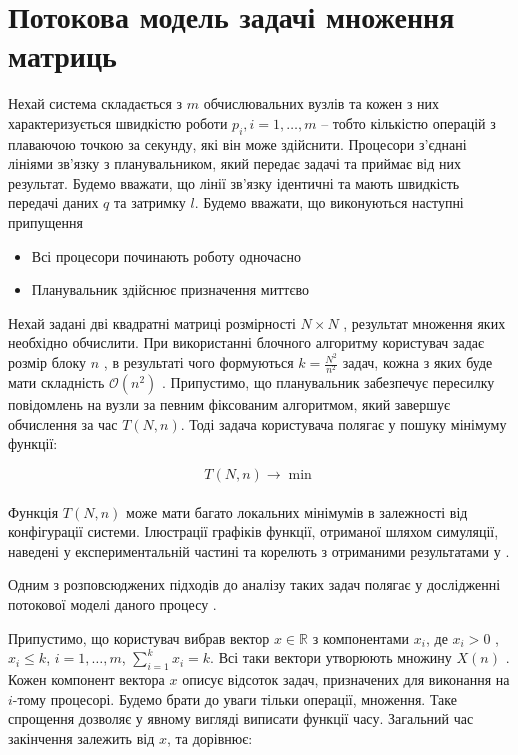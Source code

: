 
\section{Потокова модель задачі множення матриць}

Нехай система складається з $m$ обчислювальних вузлів та кожен з них характеризується швидкістю роботи $p_i , i=1,\ldots,m$ – тобто кількістю операцій з плаваючою точкою за секунду, які він може здійснити. Процесори з’єднані лініями зв’язку з планувальником, який передає задачі та приймає від них результат. Будемо вважати, що лінії зв’язку ідентичні та мають швидкість передачі даних $q$ та затримку $l$.
Будемо вважати, що виконуються наступні припущення
\begin{itemize}
	\item Всі процесори починають роботу одночасно
	\item Планувальник здійснює призначення миттєво
\end{itemize}

Нехай задані дві квадратні матриці розмірності $N \times N$ , результат множення яких необхідно обчислити. При використанні блочного алгоритму користувач задає розмір блоку $n$ , в результаті чого формуються $k=\frac{N^2}{n^2}$  задач, кожна з яких буде мати складність $\mathcal{O}(n^2)$ . Припустимо, що планувальник забезпечує пересилку повідомлень на вузли за певним фіксованим алгоритмом, який завершує обчислення за час $T(N,n)$. Тоді задача користувача полягає у пошуку мінімуму функції:

\begin{equation}
	\label{eq:general_minimization_problem}
	T(N,n) \longrightarrow \min
\end{equation}
\\
Функція $T(N,n)$ може мати багато локальних мінімумів в залежності від конфігурації системи. Ілюстрації графіків функції, отриманої шляхом симуляції, наведені у експериментальній частині та корелють з отриманими результатами у \cite{DoroshenkoIgnatenkoIvanenko}.

Одним з розповсюджених підходів до аналізу таких задач полягає у дослідженні потокової моделі даного процесу \cite{FluidModelForJobScheduling}.

Припустимо, що користувач вибрав вектор $x \in \mathbb{R}$ з компонентами $x_i$, де $x_i > 0$ , $x_i \le k$, $i=1,\ldots,m$, $\sum_{i=1}^{k}x_i = k$. Всі таки вектори утворюють множину $X(n)$ . Кожен компонент вектора $x$ описує відсоток задач, призначених для виконання на  $i$-тому процесорі. Будемо брати до уваги тільки операції, множення. Таке спрощення дозволяє у явному вигляді виписати функції часу. Загальний час закінчення залежить від  $x$, та дорівнює:

